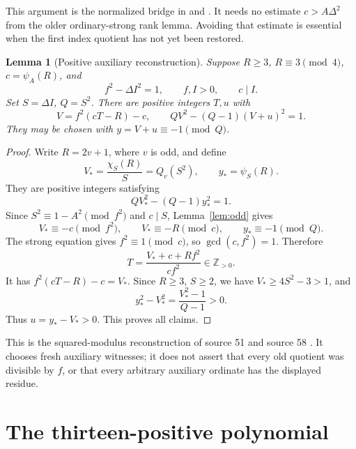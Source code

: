 \documentclass[11pt,a4paper]{article}
\newtheorem{lemma}[theorem]{Lemma}
\theoremstyle{definition}
\theoremstyle{remark}
\newcommand{\Zpos}{\mathbb Z_{>0}}
\begin{document}
This argument is the normalized bridge in
\cite[Section 3.1]{pellaudit} and \cite[Section 5]{source57}.
It needs no estimate \(c>A\Delta^2\) from the older ordinary-strong rank
lemma. Avoiding that estimate is essential when the first index quotient
has not yet been restored.

\begin{lemma}[Positive auxiliary reconstruction]
\label{lem:auxcomplete}
Suppose \(R\ge3\), \(R\equiv3\pmod4\), \(c=\psi_A(R)\), and
\[
 f^2-\Delta I^2=1,\qquad f,I>0,\qquad c\mid I.
\]
Set \(S=\Delta I\), \(Q=S^2\). There are positive integers \(T,u\) with
\[
 V=f^2(cT-R)-c,\qquad
 QV^2-(Q-1)(V+u)^2=1.
\]
They may be chosen with \(y=V+u\equiv-1\pmod Q\).
\end{lemma}
\begin{proof}
Write \(R=2v+1\), where \(v\) is odd, and define
\[
 V_*=\frac{\chi_S(R)}S=Q_v(S^2),\qquad y_*=\psi_S(R).
\]
They are positive integers satisfying
\[
 QV_*^2-(Q-1)y_*^2=1.
\]
Since \(S^2\equiv1-A^2\pmod{f^2}\) and \(c\mid S\),
Lemma~\ref{lem:odd} gives
\[
 V_*\equiv-c\pmod{f^2},\qquad V_*\equiv-R\pmod c,\qquad
 y_*\equiv-1\pmod Q.
\]
The strong equation gives \(f^2\equiv1\pmod c\), so
\(\gcd(c,f^2)=1\). Therefore
\begin{equation}
 T=\frac{V_*+c+Rf^2}{cf^2}\in\Zpos.          \label{eq:Tcomplete}
\end{equation}
It has \(f^2(cT-R)-c=V_*\).
Since \(R\ge3\), \(S\ge2\), we have \(V_*\ge4S^2-3>1\), and
\[
 y_*^2-V_*^2=\frac{V_*^2-1}{Q-1}>0.
\]
Thus \(u=y_*-V_*>0\). This proves all claims.
\end{proof}

This is the squared-modulus reconstruction of source 51 and
source 58 \cite{source51,source58}. It chooses fresh auxiliary witnesses;
it does not assert that every old quotient was divisible by \(f\), or
that every arbitrary auxiliary ordinate has the displayed residue.

\section{The thirteen-positive polynomial}
\label{sec:p13}
\end{document}
